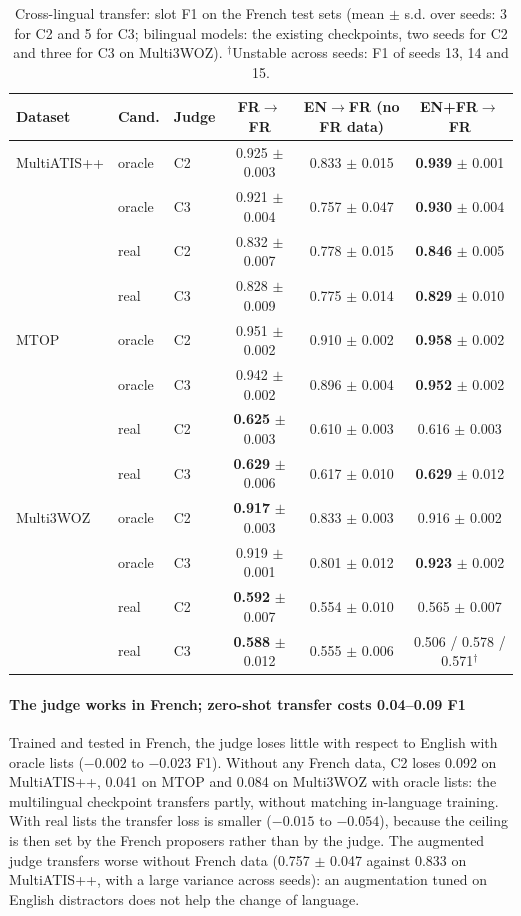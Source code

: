 \begin{table}[pos=t]
\centering
\small
\caption{Cross-lingual transfer: slot F1 on the French test sets (mean $\pm$ s.d. over seeds: 3 for C2 and 5 for C3; bilingual models: the existing checkpoints, two seeds for C2 and three for C3 on Multi3WOZ). $^{\dagger}$Unstable across seeds: F1 of seeds 13, 14 and 15.}
\label{tab:rq3}
\begin{tabular}{@{}lllccc@{}}
\toprule
Dataset & Cand. & Judge & FR$\rightarrow$FR & EN$\rightarrow$FR (no FR data) & EN+FR$\rightarrow$FR \\
\midrule
MultiATIS++ & oracle & C2 & 0.925 $\pm$ 0.003 & 0.833 $\pm$ 0.015 & \textbf{0.939} $\pm$ 0.001 \\
            & oracle & C3 & 0.921 $\pm$ 0.004 & 0.757 $\pm$ 0.047 & \textbf{0.930} $\pm$ 0.004 \\
            & real   & C2 & 0.832 $\pm$ 0.007 & 0.778 $\pm$ 0.015 & \textbf{0.846} $\pm$ 0.005 \\
            & real   & C3 & 0.828 $\pm$ 0.009 & 0.775 $\pm$ 0.014 & \textbf{0.829} $\pm$ 0.010 \\
MTOP & oracle & C2 & 0.951 $\pm$ 0.002 & 0.910 $\pm$ 0.002 & \textbf{0.958} $\pm$ 0.002 \\
     & oracle & C3 & 0.942 $\pm$ 0.002 & 0.896 $\pm$ 0.004 & \textbf{0.952} $\pm$ 0.002 \\
     & real   & C2 & \textbf{0.625} $\pm$ 0.003 & 0.610 $\pm$ 0.003 & 0.616 $\pm$ 0.003 \\
     & real   & C3 & \textbf{0.629} $\pm$ 0.006 & 0.617 $\pm$ 0.010 & \textbf{0.629} $\pm$ 0.012 \\
Multi3WOZ & oracle & C2 & \textbf{0.917} $\pm$ 0.003 & 0.833 $\pm$ 0.003 & 0.916 $\pm$ 0.002 \\
          & oracle & C3 & 0.919 $\pm$ 0.001 & 0.801 $\pm$ 0.012 & \textbf{0.923} $\pm$ 0.002 \\
          & real   & C2 & \textbf{0.592} $\pm$ 0.007 & 0.554 $\pm$ 0.010 & 0.565 $\pm$ 0.007 \\
          & real   & C3 & \textbf{0.588} $\pm$ 0.012 & 0.555 $\pm$ 0.006 & 0.506 / 0.578 / 0.571$^{\dagger}$ \\
\bottomrule
\end{tabular}
\end{table}

\paragraph{The judge works in French; zero-shot transfer costs 0.04--0.09 F1} Trained and tested in French, the judge loses little with respect to English with oracle lists ($-0.002$ to $-0.023$ F1). Without any French data, C2 loses 0.092 on MultiATIS++, 0.041 on MTOP and 0.084 on Multi3WOZ with oracle lists: the multilingual checkpoint transfers partly, without matching in-language training. With real lists the transfer loss is smaller ($-0.015$ to $-0.054$), because the ceiling is then set by the French proposers rather than by the judge. The augmented judge transfers worse without French data (0.757 $\pm$ 0.047 against 0.833 on MultiATIS++, with a large variance across seeds): an augmentation tuned on English distractors does not help the change of language.

